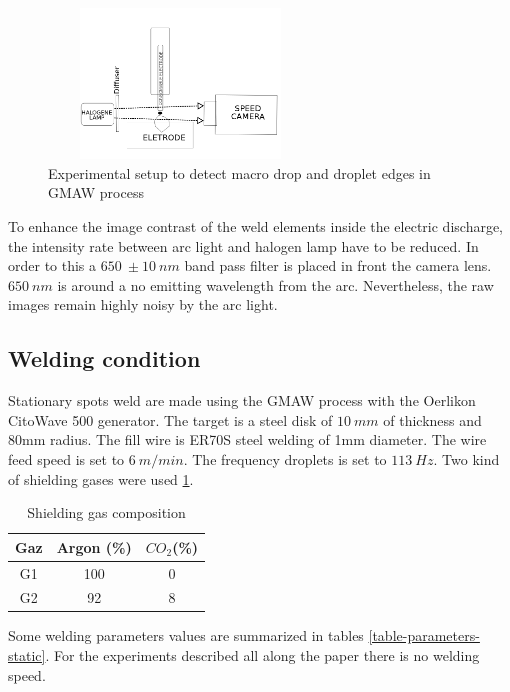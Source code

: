 \documentclass[12pt]{iopart}
\begin{document}
\begin{figure}
\begin{center}
\includegraphics[width=7cm,height=4cm]{images/schema-montage-experimental-GMAW.png}
\caption{{\small Experimental setup to detect macro drop and droplet edges in GMAW process}}
\label{fig::schema-montage-experimental-GMAW}
\end{center}
\end{figure}

To enhance the image contrast of the weld elements inside the electric discharge,
the intensity rate between arc light and halogen lamp have to be reduced. In order to this
a $650\ \pm 10\ nm$ band pass filter is placed in front the camera lens. $650\ nm$
is around a no emitting wavelength from the arc. Nevertheless, the raw images remain highly 
noisy by the arc light. 


\subsection{ Welding condition}
\label{ welding_conditions}

Stationary spots weld are made using the GMAW process with the Oerlikon CitoWave 500 generator. 
The target is a steel disk of $10\ mm$ of thickness and 80mm radius.
The fill wire is ER70S steel welding of 1mm diameter.
The  wire feed speed is set to $6\ m/min$. The frequency droplets is set to $113\ Hz$. 
Two kind of  shielding gases were used \ref{tab::gases}. 
\begin{table}[h]
\centering
\begin{tabular}{|c|c|c|}
\hline
Gaz & Argon (\%) & $CO_2$(\%) \\ \hline
G1 & 100       & 0 \\ \hline
G2 & 92        & 8 \\ \hline
\end{tabular}
\caption{Shielding gas composition}\label{tab::gases}
\end{table}

Some welding parameters values are summarized in tables \ref{table-parameters-static}.
For the experiments described all along the paper there is no welding speed.
\end{document}
